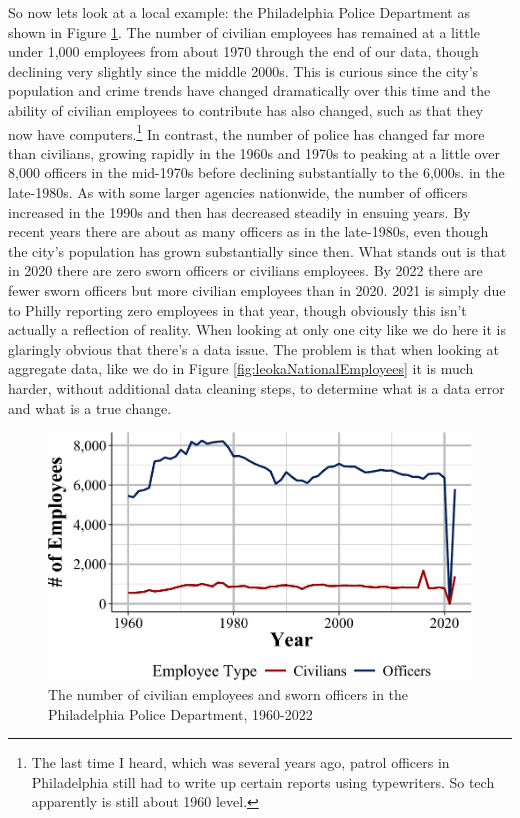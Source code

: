 \documentclass[
  12pt,
  openany]{book}
\begin{document}
So now lets look at a local example: the Philadelphia Police Department as shown in Figure \ref{fig:leokaCivilianOfficers}. The number of civilian employees has remained at a little under 1,000 employees from about 1970 through the end of our data, though declining very slightly since the middle 2000s. This is curious since the city's population and crime trends have changed dramatically over this time and the ability of civilian employees to contribute has also changed, such as that they now have computers.\footnote{The last time I heard, which was several years ago, patrol officers in Philadelphia still had to write up certain reports using typewriters. So tech apparently is still about 1960 level.} In contrast, the number of police has changed far more than civilians, growing rapidly in the 1960s and 1970s to peaking at a little over 8,000 officers in the mid-1970s before declining substantially to the 6,000s. in the late-1980s. As with some larger agencies nationwide, the number of officers increased in the 1990s and then has decreased steadily in ensuing years. By recent years there are about as many officers as in the late-1980s, even though the city's population has grown substantially since then. What stands out is that in 2020 there are zero sworn officers or civilians employees. By 2022 there are fewer sworn officers but more civilian employees than in 2020. 2021 is simply due to Philly reporting zero employees in that year, though obviously this isn't actually a reflection of reality. When looking at only one city like we do here it is glaringly obvious that there's a data issue. The problem is that when looking at aggregate data, like we do in Figure \ref{fig:leokaNationalEmployees} it is much harder, without additional data cleaning steps, to determine what is a data error and what is a true change.

\begin{figure}

{\centering \includegraphics[width=0.9\linewidth]{07_leoka_files/figure-latex/leokaCivilianOfficers-1} 

}

\caption{The number of civilian employees and sworn officers in the Philadelphia Police Department, 1960-2022}\label{fig:leokaCivilianOfficers}
\end{figure}
\end{document}
